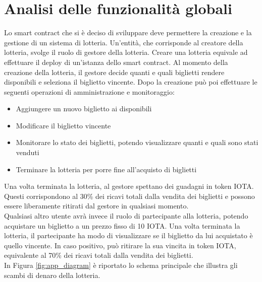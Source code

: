 \documentclass[12pt,a4paper,openright,twoside]{report}
\begin{document}
\section{Analisi delle funzionalità globali}
Lo smart contract che si è deciso di sviluppare deve permettere la creazione e la gestione di un sistema di lotteria. Un'entità, che corrisponde al creatore della lotteria, svolge il ruolo di gestore della lotteria. Creare una lotteria equivale ad effettuare il deploy di un'istanza dello smart contract. Al momento della creazione della lotteria, il gestore decide quanti e quali biglietti rendere disponibili e seleziona il biglietto vincente. Dopo la creazione può poi effettuare le seguenti operazioni di amministrazione e monitoraggio:
\begin{itemize}
    \item Aggiungere un nuovo biglietto ai disponibili
    \item Modificare il biglietto vincente
    \item Monitorare lo stato dei biglietti, potendo visualizzare quanti e quali sono stati venduti
    \item Terminare la lotteria per porre fine all'acquisto di biglietti
\end{itemize}
Una volta terminata la lotteria, al gestore spettano dei guadagni in token IOTA. Questi corrispondono al 30\% dei ricavi totali dalla vendita dei biglietti e possono essere liberamente ritirati dal gestore in qualsiasi momento.\\
Qualsiasi altro utente avrà invece il ruolo di partecipante alla lotteria, potendo acquistare un biglietto a un prezzo fisso di 10 IOTA. Una volta terminata la lotteria, il partecipante ha modo di visualizzare se il biglietto da lui acquistato è quello vincente. In caso positivo, può ritirare la sua vincita in token IOTA, equivalente al 70\% dei ricavi totali dalla vendita dei biglietti.\\
In Figura \ref{fig:app_diagram} è riportato lo schema principale che illustra gli scambi di denaro della lotteria. 
\end{document}
